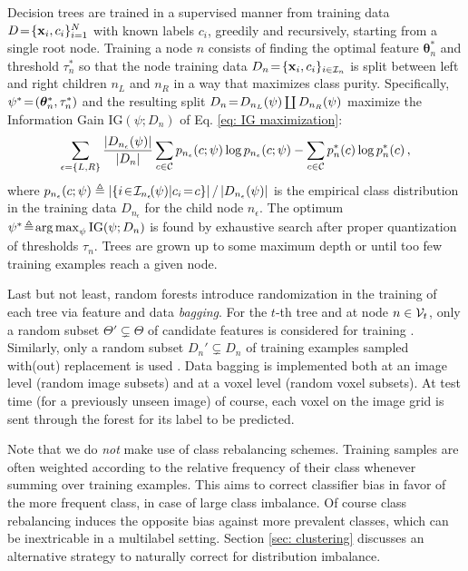 Decision trees are trained in a supervised manner from training data $D\!=\!\{\boldsymbol{\mathrm{x}}_i,c_i\}_{i=1}^N$ with known labels $c_i$, greedily and recursively, starting from a single root node. Training a node $n$ consists of finding the optimal feature $\bm{\theta}_n^\ast$ and threshold $\tau_n^\ast$ so that the node training data $D_n\!=\!\{\boldsymbol{\mathrm{x}}_i,c_i\}_{i\in\mathcal{I}_n}$ is split between left and right children $n_L$ and $n_R$ in a way that maximizes class purity. Specifically, $\psi^\ast\!=\!(\bm{\theta}_n^\ast, \tau_n^\ast)$ and the resulting split $D_n\!=\! D_{n_L}(\psi)\coprod D_{n_R}(\psi)$ maximize the Information Gain $\text{IG}(\psi; D_n)$ of Eq. \eqref{eq: IG maximization}:
\begin{equation}
\sum_{\epsilon=\{L,R\}} \frac{\vert D_{n_\epsilon}(\psi)\vert}{\vert D_n\vert}\sum_{c\in\mathcal{C}}p_{n_\epsilon}(c;\psi)\log{p_{n_\epsilon}(c;\psi)} \\ 
 -\sum_{c\in\mathcal{C}}p_{n}^\ast(c)\log{p_{n}^\ast(c)}\, ,
\label{eq: IG maximization}
\end{equation}
where $p_{n_\epsilon}(c;\psi)\triangleq\left\vert\{i\!\in\!\mathcal{I}_{n_\epsilon}\!(\psi)\vert c_i\!=\! c\}\right\vert/\left\vert D_{n_\epsilon}(\psi)\right\vert$ is the empirical class distribution in the training data $D_{n_\epsilon}$ for the child node $n_\epsilon$. The optimum $\psi^\ast\!\triangleq\! \operatorname*{arg\,max}_{\psi}\text{IG}(\psi; D_n)$ is found by exhaustive search after proper quantization of thresholds $\tau_n$. Trees are grown up to some maximum depth or until too few training examples reach a given node.

Last but not least, random forests introduce randomization in the training of each tree via feature and data \textit{bagging}. For the $t$-th tree and at node $n\in\mathcal{V}_t$, only a random subset $\Theta' \!\varsubsetneq\! \Theta$ of candidate features is considered for training \cite{amit1997shape,ho1998random}. %
Similarly, only a random subset $D_n'\!\varsubsetneq\!D_n$ of training examples sampled with(out) replacement is used \cite{breiman1996bagging}. %
Data bagging is implemented both at an image level (random image subsets) and at a voxel level (random voxel subsets). At test time (for a previously unseen image) of course, each voxel on the image grid is sent through the forest for its label to be predicted. 

Note that we do \textit{not} make use of class rebalancing schemes. Training samples are often weighted according to the relative frequency of their class whenever summing over training examples. This aims to correct classifier bias in favor of the more frequent class, in case of large class imbalance. Of course class rebalancing induces the opposite bias against more prevalent classes, which can be inextricable in a multilabel setting. Section \ref{sec: clustering} discusses an alternative strategy to naturally correct for distribution imbalance.
